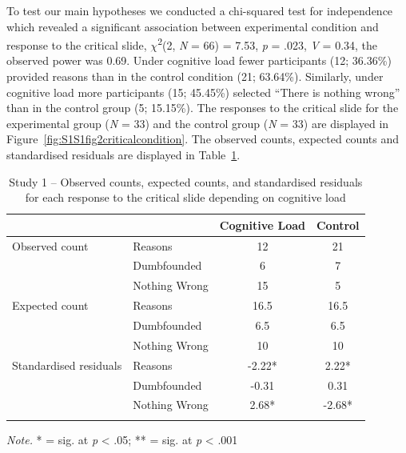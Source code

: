 \documentclass[
  american,
  man,floatsintext]{apa7}
\begin{document}
To test our main hypotheses we conducted a chi-squared test for independence which revealed a significant association between experimental condition and response to the critical slide, \(\chi\)\textsuperscript{2}(2, \emph{N} = 66) = 7.53, \emph{p} = .023, \emph{V} = 0.34, the observed power was 0.69. Under cognitive load fewer participants (12; 36.36\%) provided reasons than in the control condition (21; 63.64\%). Similarly, under cognitive load more participants (15; 45.45\%) selected ``There is nothing wrong'' than in the control group (5; 15.15\%). The responses to the critical slide for the experimental group (\emph{N} = 33) and the control group (\emph{N} = 33) are displayed in Figure~\ref{fig:S1S1fig2criticalcondition}. The observed counts, expected counts and standardised residuals are displayed in Table~\ref{tab:S1tab1dumb}.

\begin{table}[tbp]

\begin{center}
\begin{threeparttable}

\caption{\label{tab:S1tab1dumb}Study 1 – Observed counts, expected counts, and standardised residuals for each response to the critical slide depending on cognitive load}

\begin{tabular}{llcc}
\toprule
 & \multicolumn{1}{c}{} & \multicolumn{1}{c}{Cognitive Load} & \multicolumn{1}{c}{Control}\\
\midrule
Observed count & Reasons & 12 & 21\\
 & Dumbfounded & 6 & 7\\
 & Nothing Wrong & 15 & 5\\
Expected count & Reasons & 16.5 & 16.5\\
 & Dumbfounded & 6.5 & 6.5\\
 & Nothing Wrong & 10 & 10\\
Standardised residuals & Reasons & -2.22* & 2.22*\\
 & Dumbfounded & -0.31 & 0.31\\
 & Nothing Wrong & 2.68* & -2.68*\\
\bottomrule
\addlinespace
\end{tabular}

\begin{tablenotes}[para]
\normalsize{\textit{Note.} * = sig. at \emph{p} < .05; ** = sig. at \emph{p} < .001}
\end{tablenotes}

\end{threeparttable}
\end{center}

\end{table}
\end{document}
